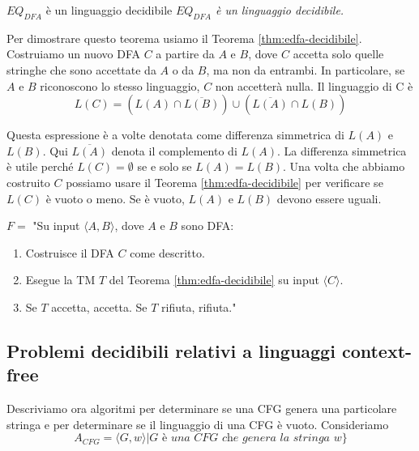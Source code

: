 \begin{Thm}{$EQ_{DFA}$ è un linguaggio decidibile}{}
\textit{$EQ_{DFA}$ è un linguaggio decidibile.}

\begin{demonstration}
Per dimostrare questo teorema usiamo il Teorema \ref{thm:edfa-decidibile}. Costruiamo un nuovo DFA $C$ a partire da $A$ e $B$, dove $C$ accetta solo quelle stringhe che sono accettate da $A$ o da $B$, ma non da entrambi. In particolare, se $A$ e $B$ riconoscono lo stesso linguaggio, $C$ non accetterà nulla. Il linguaggio di C è
\begin{equation*}
L(C) =(L(A) \cap \overline{L(B)}) \cup( \overline{L(A)} \cap L(B))    
\end{equation*}

Questa espressione è a volte denotata come differenza simmetrica di $L(A)$ e $L(B)$. Qui $\overline{L(A)}$ denota il complemento di $L(A)$. La differenza simmetrica è utile perché $L(C) = \emptyset$ se e solo se $L(A) = L(B)$. Una volta che abbiamo costruito $C$ possiamo usare il Teorema \ref{thm:edfa-decidibile} per verificare se $L(C)$ è vuoto o meno. Se è vuoto, $L(A)$ e $L(B)$ devono essere uguali.

$F=$ "Su input $\langle A, B\rangle$, dove $A$ e $B$ sono DFA:
\begin{enumerate}
    \item Costruisce il DFA $C$ come descritto.
    \item Esegue la TM $T$ del Teorema \ref{thm:edfa-decidibile} su input $\langle C\rangle$.
    \item Se $T$ accetta, accetta. Se $T$ rifiuta, rifiuta."
\end{enumerate}
\end{demonstration}
\end{Thm}

\subsection{Problemi decidibili relativi a linguaggi context-free}
Descriviamo ora algoritmi per determinare se una CFG genera una particolare stringa e per determinare se il linguaggio di una CFG è vuoto. Consideriamo
\begin{equation*}
A_{CFG} =\langle G,w \rangle | G\textit{ è una CFG che genera la stringa }w\}
\end{equation*}

